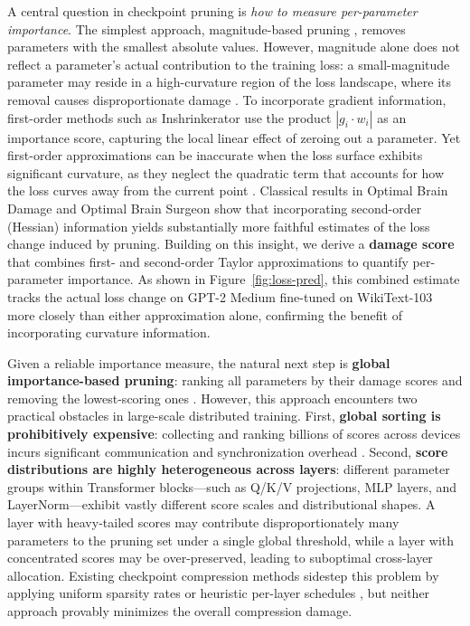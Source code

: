 ﻿\documentclass[11pt]{article}
\begin{document}
A central question in checkpoint pruning is \emph{how to measure per-parameter importance}.
The simplest approach, magnitude-based pruning \citep{deep-compression}, removes parameters with the smallest absolute values.
However, magnitude alone does not reflect a parameter's actual contribution to the training loss: a small-magnitude parameter may reside in a high-curvature region of the loss landscape, where its removal causes disproportionate damage \citep{obd}.
To incorporate gradient information, first-order methods such as Inshrinkerator \citep{inshrinkerator} use the product $|g_i \cdot w_i|$ as an importance score, capturing the local linear effect of zeroing out a parameter.
Yet first-order approximations can be inaccurate when the loss surface exhibits significant curvature, as they neglect the quadratic term that accounts for how the loss curves away from the current point \citep{obs}.
Classical results in Optimal Brain Damage \citep{obd} and Optimal Brain Surgeon \citep{obs} show that incorporating second-order (Hessian) information yields substantially more faithful estimates of the loss change induced by pruning.
Building on this insight, we derive a \textbf{damage score} that combines first- and second-order Taylor approximations to quantify per-parameter importance.
As shown in Figure~\ref{fig:loss-pred}, this combined estimate tracks the actual loss change on GPT-2 Medium fine-tuned on WikiText-103 more closely than either approximation alone, confirming the benefit of incorporating curvature information.

Given a reliable importance measure, the natural next step is \textbf{global importance-based pruning}: ranking all parameters by their damage scores and removing the lowest-scoring ones \citep{obd,obs}.
However, this approach encounters two practical obstacles in large-scale distributed training.
First, \textbf{global sorting is prohibitively expensive}: collecting and ranking billions of scores across devices incurs significant communication and synchronization overhead \citep{zero}.
Second, \textbf{score distributions are highly heterogeneous across layers}: different parameter groups within Transformer blocks---such as Q/K/V projections, MLP layers, and LayerNorm---exhibit vastly different score scales and distributional shapes.
A layer with heavy-tailed scores may contribute disproportionately many parameters to the pruning set under a single global threshold, while a layer with concentrated scores may be over-preserved, leading to suboptimal cross-layer allocation.
Existing checkpoint compression methods sidestep this problem by applying uniform sparsity rates \citep{excp} or heuristic per-layer schedules \citep{inshrinkerator}, but neither approach provably minimizes the overall compression damage.
\end{document}
